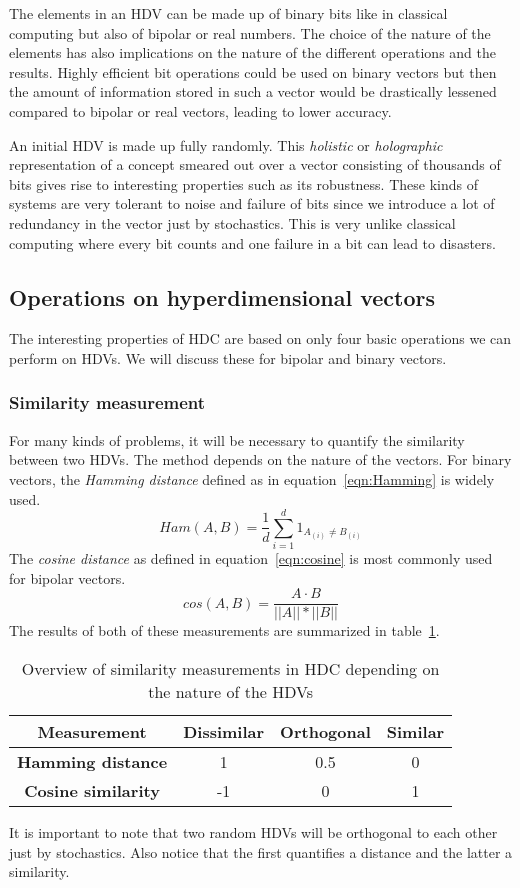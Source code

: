 The elements in an HDV can be made up of binary bits like in classical computing but also of bipolar or real numbers. The choice of the nature of the elements has also implications on the nature of the different operations and the results. Highly efficient bit operations could be used on binary vectors but then the amount of information stored in such a vector would be drastically lessened compared to bipolar or real vectors, leading to lower accuracy.  

An initial HDV is made up fully randomly. This \textit{holistic} or \textit{holographic} representation of a concept smeared out over a vector consisting of thousands of bits gives rise to interesting properties such as its robustness. These kinds of systems are very tolerant to noise and failure of bits since we introduce a lot of redundancy in the vector just by stochastics. This is very unlike classical computing where every bit counts and one failure in a bit can lead to disasters. 
\subsection{Operations on hyperdimensional vectors}
The interesting properties of HDC are based on only four basic operations we can perform on HDVs. We will discuss these for bipolar and binary vectors.
\subsubsection{Similarity measurement} \label{sssec:sim}
For many kinds of problems, it will be necessary to quantify the similarity between two HDVs. The method depends on the nature of the vectors. For binary vectors, the \textit{Hamming distance} defined as in equation~\ref{eqn:Hamming} is widely used.
\begin{equation}
    \label{eqn:Hamming}
    Ham(A, B) = \frac{1}{d} \sum_{i=1}^{d} 1_{A_{(i)} \neq B_{(i)}}
\end{equation}
The \textit{cosine distance} as defined in equation~\ref{eqn:cosine} is most commonly used for bipolar vectors.
\begin{equation}
    \label{eqn:cosine}
    cos(A, B) = \frac{A \cdot B}{||A|| * ||B||}
\end{equation}
The results of both of these measurements are summarized in table~\ref{tab:dist}.
\begin{table}[h]
    \begin{tabular}{|c||c|c|c|}
        \hline
        \textbf{Measurement} & \textbf{Dissimilar} & \textbf{Orthogonal} & \textbf{Similar} \\
        \hline
        \textbf{Hamming distance} & 1 & 0.5 & 0 \\
        \hline
        \textbf{Cosine similarity} & -1 & 0 & 1 \\
        \hline
    \end{tabular}
    \caption{\label{tab:dist}Overview of similarity measurements in HDC depending on the nature of the HDVs} 
\end{table}
It is important to note that two random HDVs will be orthogonal to each other just by stochastics. Also notice that the first quantifies a distance and the latter a similarity.
